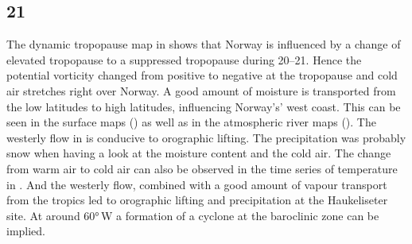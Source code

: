 \subsection*{\SI{21}{\dec}}
The dynamic tropopause map in  shows that Norway is influenced by a change of elevated tropopause to a suppressed tropopause during \SIrange{20}{21}{\dec}. Hence the potential vorticity changed from positive to negative at the tropopause and cold air stretches right over Norway.
A good amount of moisture is transported from the low latitudes to high latitudes, influencing Norway’s' west coast. This can be seen in the surface maps () as well as in the atmospheric river maps (). The westerly flow in  is conducive to orographic lifting. The precipitation was probably snow when having a look at the moisture content and the cold air. The change from warm air to cold air can also be observed in the time series of temperature in . And the westerly flow, combined with a good amount of vapour transport from the tropics led to orographic lifting and precipitation at the Haukeliseter site. 
At around \ang{60}{\,W} a formation of a cyclone at the baroclinic zone can be implied.  

